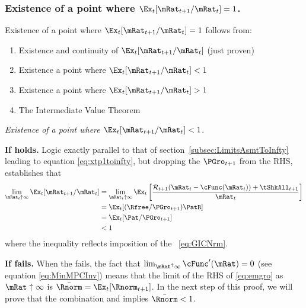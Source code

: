 \documentclass[\econtexRoot/BufferStockTheory]{subfiles}
\begin{document}
\subsubsection{Existence of a point where $\Ex_t [{\mRat}_{t+1}/\mRat_t]=1$.}

Existence of a point where $\Ex_t [{\mRat}_{t+1}/\mRat_t] = 1$ follows from:
\begin{enumerate}
\item Existence and continuity of $\Ex_t [{\mRat}_{t+1}/\mRat_t]$ (just proven)
  \item Existence a point where $\Ex_t [{\mRat}_{t+1}/\mRat_t] < 1$
  \item Existence a point where $\Ex_t [{\mRat}_{t+1}/\mRat_t] > 1$
    \item The Intermediate Value Theorem
    \end{enumerate}

\noindent    \textit{Existence of a point where $\Ex_t [{\mRat}_{t+1}/\mRat_t] < 1$}.
    
\textbf{If {\RIC} holds.}  Logic exactly parallel to that of section~\ref{subsec:LimitsAsmtToInfty} leading to equation \eqref{eq:xtp1toinfty}, but dropping the $\PGro_{t+1}$ from the RHS, establishes that
\begin{equation}\begin{gathered}\begin{aligned}
  \lim_{\mRat_{t} \uparrow \infty} \Ex_{t}[{\mRat}_{t+1}/\mRat_{t}]  & =   
                                                                       \lim_{\mRat_{t} \uparrow \infty} 
                                                                       \Ex_{t}\left[\frac{{\mathcal{\mathcal{R}}}_{t+1}(\mRat_{t}-\cFunc(\mRat_{t}))+{\tShkAll}_{t+1}}{\mRat_{t}}\right] \notag 
  \\  & = \Ex_{t}[(\Rfree/{\PGro}_{t+1})\PatR]  \notag
  \\  & = \Ex_{t}[{\Pat}/{\PGro}_{t+1}]  \label{eq:emgro}
  \\  & < 1 \notag
\end{aligned}\end{gathered}\end{equation}
where the inequality reflects imposition of the \GICNrm~\eqref{eq:GICNrm}.

\textbf{If {\RIC} fails.}  When the {\RIC} fails, the fact that $\lim_{\mRat^{\uparrow} \infty} \cFunc^{\prime}(\mRat) = 0$ (see equation \eqref{eq:MinMPCInv}) means that the limit of the RHS of \eqref{eq:emgro} as $\mRat \uparrow \infty$ is $\bar{\Rnorm}=\Ex_{t}[\Rnorm_{t+1}]$.  In the next step of this proof, we will prove that the combination {\GICNrm} and \cncl{\RIC} implies $\bar{\Rnorm} < 1$.
\end{document}
